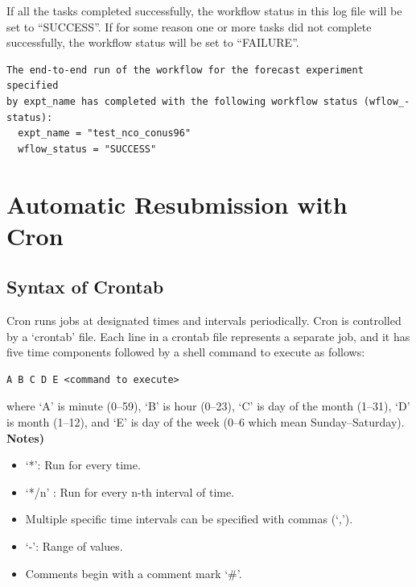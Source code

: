 \documentclass[11pt,fleqn]{report}              %
\begin{document}
If all the tasks completed successfully, the workflow status in this log file will be set to ``SUCCESS''. If for some reason one or more tasks did not complete successfully, the workflow status will be set to ``FAILURE''.

\lstset{language=bash}   
\begin{lstlisting}[frame=trBL]
The end-to-end run of the workflow for the forecast experiment specified 
by expt_name has completed with the following workflow status (wflow_-
status):
  expt_name = "test_nco_conus96"
  wflow_status = "SUCCESS"
\end{lstlisting}




\section{Automatic Resubmission with Cron}                 
\label{sec:auto_resub_cron}

\subsection{Syntax of Crontab}
\label{subsec:cron_syntax}

Cron runs jobs at designated times and intervals periodically. Cron is controlled by a `crontab' file.  Each line in a crontab file represents a separate job, and it has five time components followed by a shell command to execute as follows:

\lstset{language=bash}   
\begin{lstlisting}[frame=trBL]
A B C D E <command to execute>
\end{lstlisting}
where `A' is minute (0--59), `B' is hour (0--23), `C' is day of the month (1--31), `D' is month (1--12), and `E' is day of the week (0--6 which mean Sunday--Saturday). \\

{\bf Notes)}
\begin{itemize}
\item `*': Run for every time.
\item `*/n' : Run for every n-th interval of time.
\item Multiple specific time intervals can be specified with commas (`,').
\item `-': Range of values.
\item Comments begin with a comment mark `\#'.
\end{itemize}
\end{document}
